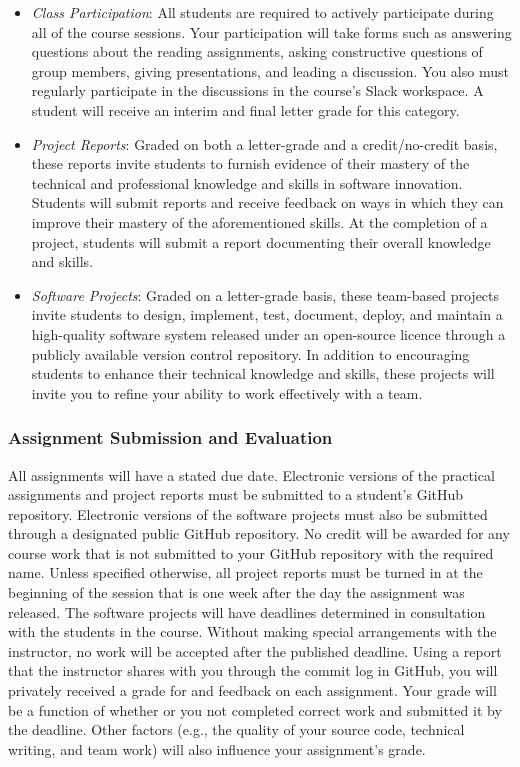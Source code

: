 \documentclass[11pt]{article}
\begin{document}
\begin{itemize}

  \item {\em Class Participation\/}: All students are required to actively
    participate during all of the course sessions. Your participation will take
    forms such as answering questions about the reading assignments, asking
    constructive questions of group members, giving presentations, and leading a
    discussion. You also must regularly participate in the discussions in the
    course's Slack workspace. A student will receive an interim and final letter
    grade for this category.

  \item {\em Project Reports\/}: Graded on both a letter-grade and a
    credit/no-credit basis, these reports invite students to furnish evidence of
    their mastery of the technical and professional knowledge and skills in
    software innovation. Students will submit reports and receive feedback on
    ways in which they can improve their mastery of the aforementioned skills.
    At the completion of a project, students will submit a report documenting
    their overall knowledge and skills.

  \item {\em Software Projects\/}: Graded on a letter-grade basis, these
    team-based projects invite students to design, implement, test, document,
    deploy, and maintain a high-quality software system released under an
    open-source licence through a publicly available version control repository.
    In addition to encouraging students to enhance their technical knowledge and
    skills, these projects will invite you to refine your ability to work
    effectively with a team.

\end{itemize}

\subsubsection*{Assignment Submission and Evaluation}

All assignments will have a stated due date. Electronic versions of the
practical assignments and project reports must be submitted to a student's
GitHub repository. Electronic versions of the software projects must also be
submitted through a designated public GitHub repository. No credit will be
awarded for any course work that is not submitted to your GitHub repository with
the required name.
%
Unless specified otherwise, all project reports must be turned in at the
beginning of the session that is one week after the day the assignment was
released. The software projects will have deadlines determined in consultation
with the students in the course. Without making special arrangements with the
instructor, no work will be accepted after the published deadline.
%
Using a report that the instructor shares with you through the commit log in
GitHub, you will privately received a grade for and feedback on each assignment.
Your grade will be a function of whether or you not completed correct work and
submitted it by the deadline. Other factors (e.g., the quality of your source
code, technical writing, and team work) will also influence your assignment's
grade.
\end{document}
